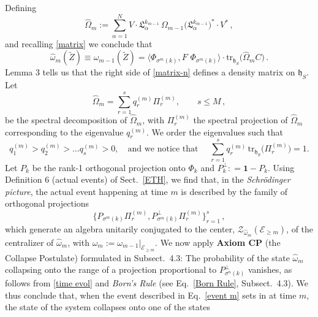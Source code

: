 \documentclass[12pt]{article}
\begin{document}
Defining
\begin{equation}\label{matrix-n}
\widehat{\Omega}_{m}:= \sum_{\alpha=1}^{N} V\cdot \mathfrak{L}_{\alpha}^{k_{m-1}} \, \Omega_{m-1}
\big(\mathfrak{L}_{\alpha}^{k_{m-1}}\big)^{*}\cdot V^{*}\,,
\end{equation}
and recalling \eqref{matrix} we conclude that
\begin{equation}\label{time evol}
\widehat{\omega}_{m}(\tilde{Z})\equiv \omega_{m-1}(\tilde{Z})= \langle \Phi_{\sigma^{m}({k})}, F\,\, \Phi_{\sigma^{m}({k})} \rangle \cdot
\text{tr}_{\mathfrak{h}_S} \big(\widehat{\Omega}_{m} C\big)\,.
\end{equation}
Lemma 3 tells us that the right side of \eqref{matrix-n} defines a density matrix on $\mathfrak{h}_S$. Let
\begin{equation}\label{spect dec}
\widehat{\Omega}_{m} = \sum_{r=1}^{s} q_{r}^{(m)} \Pi_{r}^{(m)}, \qquad s\leq M\,,
\end{equation}
be the spectral decomposition of $\widehat{\Omega}_m$, with $\Pi_{r}^{(m)}$ the spectral projection of
$\widehat{\Omega}_m$ corresponding to the eigenvalue $q_{r}^{(m)}$. We order the eigenvalues such that
$$q_{1}^{(m)} > q_{2}^{(m)} > \dots q_{s}^{(m)} > 0,\quad  \text{and we notice that }\quad
\sum_{r=1}^{s} q_{r}^{(m)} \,\text{tr}_{\mathfrak{h}_S}\big(\Pi_{r}^{(m)}\big) =1.$$
Let $P_{{k}}$ be the rank-1 orthogonal projection onto $\Phi_{{k}}$ and
$P_{{k}}^{\perp}: =\mathbf{1}- P_{{k}}$. Using Definition 6 (actual events) of Sect.~\ref{ETH},
we find that, in the \textit{Schr\"odinger picture}, the actual event happening at time $m$ is described
by the family of orthogonal projections
\begin{equation}\label{event m}
\big\{P_{\sigma^{m}({k})} \Pi_{r}^{(m)}, P_{\sigma^{m}({k})}^{\perp} \Pi_{r}^{(m)}\big\}_{r=1}^{s}\,,
\end{equation}
which generate an algebra unitarily conjugated to the center, $\mathcal{Z}_{\widehat{\omega}_m}(\mathcal{E}_{\geq m})$,
of the centralizer of $\widehat{\omega}_m$, with $\widehat{\omega}_m :=\omega_{m-1}\vert_{\mathcal{E}_{\geq m}}$. We now apply {\bf{Axiom CP}} (the Collapse Postulate) formulated in Subsect.~4.3:
The probability of the state $\widehat{\omega}_m$ collapsing onto the range of a projection proportional to
$P_{\sigma^{n}({k})}^{\perp}$ vanishes, as follows from \eqref{time evol} and \textit{Born's Rule}
(see Eq.~\eqref{Born Rule}, Subsect.~4.3). We thus conclude that, when the event described in
Eq.~\eqref{event m} sets in at time $m$, the state of the system collapses onto one of the states
\end{document}
